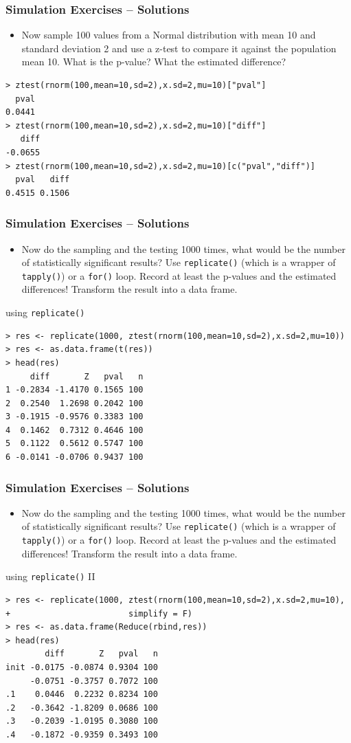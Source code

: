 \documentclass[xcolor={table}]{beamer}
\begin{document}
\begin{frame}[fragile]\frametitle{Simulation Exercises -- Solutions} 
  \begin{itemize}
  \item Now sample 100 values from a Normal distribution with mean 10 and standard deviation 2 and use a z-test to compare it against the population mean 10. What is the p-value? What the estimated difference?
  \end{itemize}
\begin{verbatim}
> ztest(rnorm(100,mean=10,sd=2),x.sd=2,mu=10)["pval"]
  pval 
0.0441   
> ztest(rnorm(100,mean=10,sd=2),x.sd=2,mu=10)["diff"]
   diff 
-0.0655 
> ztest(rnorm(100,mean=10,sd=2),x.sd=2,mu=10)[c("pval","diff")]
  pval   diff 
0.4515 0.1506 
\end{verbatim}
\end{frame}


\begin{frame}[fragile]\frametitle{Simulation Exercises -- Solutions} 
  \begin{itemize}
  \item Now do the sampling and the testing 1000 times, what would be the number of statistically significant results? Use \texttt{replicate()} (which is a wrapper of \texttt{tapply()}) or a \texttt{for()} loop. Record at least the p-values and the estimated differences! Transform the result into a data frame.
  \end{itemize}
using \texttt{replicate()}\footnotesize
\begin{verbatim}
> res <- replicate(1000, ztest(rnorm(100,mean=10,sd=2),x.sd=2,mu=10))
> res <- as.data.frame(t(res))
> head(res)
     diff       Z   pval   n
1 -0.2834 -1.4170 0.1565 100
2  0.2540  1.2698 0.2042 100
3 -0.1915 -0.9576 0.3383 100
4  0.1462  0.7312 0.4646 100
5  0.1122  0.5612 0.5747 100
6 -0.0141 -0.0706 0.9437 100
\end{verbatim}
\end{frame}


\begin{frame}[fragile]\frametitle{Simulation Exercises -- Solutions} 
  \begin{itemize}
  \item Now do the sampling and the testing 1000 times, what would be the number of statistically significant results? Use \texttt{replicate()} (which is a wrapper of \texttt{tapply()}) or a \texttt{for()} loop. Record at least the p-values and the estimated differences! Transform the result into a data frame.
  \end{itemize}
using \texttt{replicate()} II\footnotesize
\begin{verbatim}
> res <- replicate(1000, ztest(rnorm(100,mean=10,sd=2),x.sd=2,mu=10),
+                        simplify = F)
> res <- as.data.frame(Reduce(rbind,res))
> head(res)
        diff       Z   pval   n
init -0.0175 -0.0874 0.9304 100
     -0.0751 -0.3757 0.7072 100
.1    0.0446  0.2232 0.8234 100
.2   -0.3642 -1.8209 0.0686 100
.3   -0.2039 -1.0195 0.3080 100
.4   -0.1872 -0.9359 0.3493 100
\end{verbatim}
\end{frame}
\end{document}
